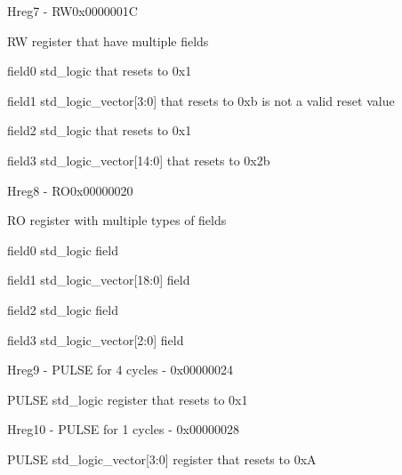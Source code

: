 \documentclass{article}
\begin{document}
\begin{register}{H}{reg7 - RW}{0x0000001C}  \par RW register that have multiple fields \regnewline
  \label{reg7}
\regnewline
  \begin{regdesc}\begin{reglist}[field0]
    \item [field0] std{\_}logic that resets to 0x1    \item [field1] std{\_}logic{\_}vector[3:0] that resets to 0xb is not a valid reset value    \item [field2] std{\_}logic that resets to 0x1    \item [field3] std{\_}logic{\_}vector[14:0] that resets to 0x2b  \end{reglist}\end{regdesc}
\end{register}

\begin{register}{H}{reg8 - RO}{0x00000020}  \par RO register with multiple types of fields \regnewline
  \label{reg8}
\regnewline
  \begin{regdesc}\begin{reglist}[field0]
    \item [field0] std{\_}logic field    \item [field1] std{\_}logic{\_}vector[18:0] field    \item [field2] std{\_}logic field    \item [field3] std{\_}logic{\_}vector[2:0] field  \end{reglist}\end{regdesc}
\end{register}

\begin{register}{H}{reg9 - PULSE for 4 cycles - }{0x00000024}  \par PULSE std{\_}logic register that resets to 0x1 \regnewline
  \label{reg9}
\regnewline
\end{register}

\begin{register}{H}{reg10 - PULSE for 1 cycles - }{0x00000028}  \par PULSE std{\_}logic{\_}vector[3:0] register that resets to 0xA \regnewline
  \label{reg10}
\regnewline
\end{register}
\end{document}
